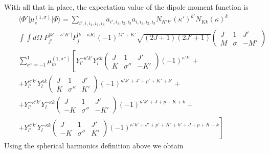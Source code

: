 With all that in place, the expectation value of the dipole moment function is
\begin{eqnarray}  \nonumber &&
\langle \Phi' \vert \mu^{(1,\sigma)}_s \vert \Phi \rangle = 
\sum_{i',i,i_1,i_2,i_3} a_{i',i_1,i_2,i_3} a_{i,i_1,i_2,i_3} N_{K'k'} (\kappa')^{k'} N_{Kk} (\kappa)^{k}
\\ \nonumber &&
\int \int d\Omega \; P^{\vert k' - \kappa' K' \vert}_{j'} P^{\vert k - \kappa K \vert}_{j}
(-1)^{M'+K'} \sqrt{(2 J+1)(2 J'+1)} 
\left( \begin{array}{ccc} 
 J &      1 &  J' \\
 M & \sigma & -M'  \end{array} \right)
\\ \nonumber &&
\sum^{1}_{\sigma'' = -1} \mu^{(1,\sigma'')}_m
\left[ Y^{- \kappa' k'}_{l'}  Y^{\kappa k}_{l} 
\left( \begin{array}{ccc} 
 J &        1 &  J' \\
 K & \sigma'' & -K'  \end{array} \right) (-1)^{\kappa' k'} \right. +
\\ \nonumber &&
+ Y^{ \kappa' k'}_{l'}  Y^{\kappa k}_{l} 
\left( \begin{array}{ccc} 
 J &        1 &  J' \\
 K & \sigma'' &  K'  \end{array} \right) (-1)^{\kappa' k' + J'+p'+K'+k'} +
\\ \nonumber &&
+ Y^{- \kappa' k'}_{l'}  Y^{- \kappa k}_{l} 
\left( \begin{array}{ccc} 
 J &        1 &  J' \\
-K & \sigma'' & -K'  \end{array} \right) (-1)^{\kappa' k' + J+p+K+k} +
\\           &&
\left. + Y^{ \kappa' k'}_{l'}  Y^{- \kappa k}_{l} 
\left( \begin{array}{ccc} 
 J &        1 &  J' \\
-K & \sigma'' &  K'  \end{array} \right) (-1)^{\kappa' k' + J'+p'+K'+k' + J+p+K+k} \right]
\end{eqnarray}
Using the spherical harmonics definition above we obtain
